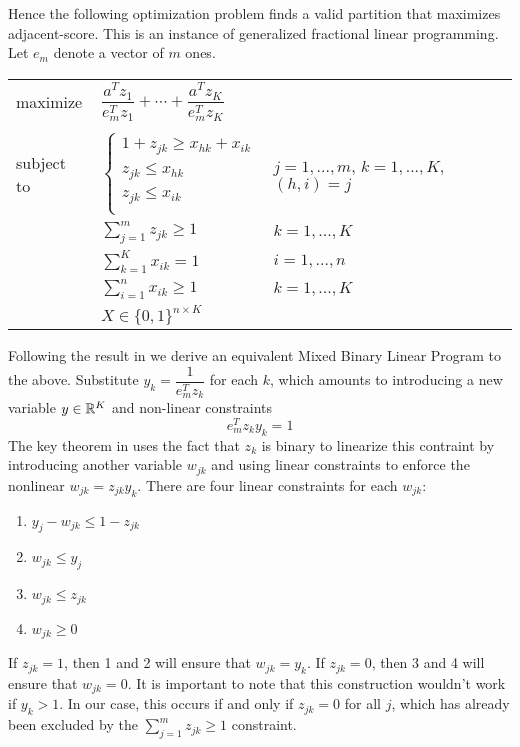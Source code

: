 Hence the following optimization problem finds a valid partition that
maximizes adjacent-score. This is an instance of generalized fractional
linear programming. Let $e_m$ denote a vector of $m$ ones.

\begin{center}
\bgroup
\def\arraystretch{1.5}
\begin{tabular}{l l l}
maximize   & $\dfrac{a^T z_1}{e_m^T z_1} + \cdots +
              \dfrac{a^T z_K}{e_m^T z_K}$ \\ \\
subject to 
           & $\begin{cases}
                 1 + z_{jk} \geq x_{hk} + x_{ik} \\
                 z_{jk} \leq x_{hk}             \\
                 z_{jk} \leq x_{ik}             \\
             \end{cases}$
           & $j = 1, ..., m$, $k = 1, ..., K$, $(h,i) = j$ \\
           & $\sum_{j=1}^m z_{jk} \geq 1$ & $k = 1, ..., K$ \\
           & $\sum_{k=1}^K x_{ik} = 1$ & $i = 1, ..., n$ \\
           & $\sum_{i=1}^n x_{ik} \geq 1$ & $k = 1, ..., K$ \\
           & $X \in \{0, 1\}^{n \times K}$
\end{tabular}
\egroup
\end{center}

Following the result in \cite{Li:94} we derive an equivalent Mixed
Binary Linear Program to the above.
Substitute $y_k = \dfrac{1}{e_m^T z_k}$ for each $k$, which amounts to
introducing a new variable $y \in \mathbb{R}^K$ and non-linear constraints
\[ e_m^T z_k y_k = 1 \]
The key theorem in \cite{Li:94} uses the fact that $z_k$ is binary to
linearize this contraint by introducing another variable $w_{jk}$ and
using linear constraints to enforce the nonlinear $w_{jk} = z_{jk} y_k$.
There are four linear constraints for each $w_{jk}$:

\begin{enumerate}
\item
$y_j - w_{jk} \leq 1 - z_{jk} $
\item
$w_{jk} \leq y_j$
\item
$w_{jk} \leq z_{jk}$
\item
$w_{jk} \geq 0$ 
\end{enumerate}

If $z_{jk} = 1$, then 1 and 2 will ensure that $w_{jk} = y_k$.
If $z_{jk} = 0$, then 3 and 4 will ensure that $w_{jk} = 0$.
It is important to note that this construction wouldn't work if
$y_k > 1$. In our case, this occurs if and only if $z_{jk} = 0$ for all
$j$, which has already been excluded by the $\sum_{j=1}^m z_{jk} \geq 1$
constraint.

